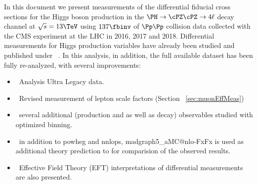 In this document we present measurements of the differential fiducial cross sections for the Higgs boson production in the $\HZZfl$ decay channel at $\sqrt{s}=13\TeV$ using $\usedLumiABC$ of $\Pp\Pp$ collision data collected with the CMS experiment at the LHC in 2016, 2017 and 2018.
Differential measurements for Higgs production variables have already been studied and published under ~\cite{CMS-PAS-HIG-19-001}. In this analysis, in addition, the full available dataset has been fully re-analyzed, with several improvements: 
\begin{itemize}
\item~Analysis Ultra Legacy data.
\item~Revised measurement of lepton scale factors (Section ~\ref{sec:muonEffMeas}) %
\item~several additional (production and as well as decay) observables studied with optimized binning.
\item~in addition to {\sc powheg} and {\sc nnlops}, {\sc madgraph5\_aMC@nlo-FxFx} is used as additional theory prediction to for comparision of the observed results.
\item~Effective Field Theory (EFT) interpretations of differential measurements are also presented.
\end{itemize}

